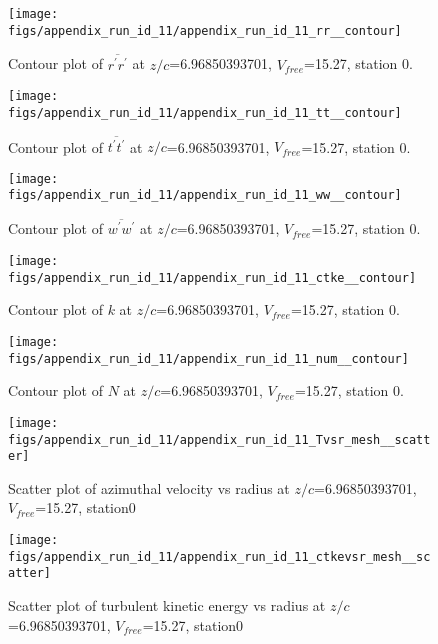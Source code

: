 \begin{figure}[H]
\centering
\texttt{[image: figs/appendix\_run\_id\_11/appendix\_run\_id\_11\_rr\_\_contour]}
\caption{Contour plot of $\overline{r^\prime r^\prime}$ at $z/c$=6.96850393701, $V_{free}$=15.27, station 0.}
\label{fig:appendix_run_id_11_rr__contour}
\end{figure}


\begin{figure}[H]
\centering
\texttt{[image: figs/appendix\_run\_id\_11/appendix\_run\_id\_11\_tt\_\_contour]}
\caption{Contour plot of $\overline{t^\prime t^\prime}$ at $z/c$=6.96850393701, $V_{free}$=15.27, station 0.}
\label{fig:appendix_run_id_11_tt__contour}
\end{figure}


\begin{figure}[H]
\centering
\texttt{[image: figs/appendix\_run\_id\_11/appendix\_run\_id\_11\_ww\_\_contour]}
\caption{Contour plot of $\overline{w^\prime w^\prime}$ at $z/c$=6.96850393701, $V_{free}$=15.27, station 0.}
\label{fig:appendix_run_id_11_ww__contour}
\end{figure}


\begin{figure}[H]
\centering
\texttt{[image: figs/appendix\_run\_id\_11/appendix\_run\_id\_11\_ctke\_\_contour]}
\caption{Contour plot of $k$ at $z/c$=6.96850393701, $V_{free}$=15.27, station 0.}
\label{fig:appendix_run_id_11_ctke__contour}
\end{figure}


\begin{figure}[H]
\centering
\texttt{[image: figs/appendix\_run\_id\_11/appendix\_run\_id\_11\_num\_\_contour]}
\caption{Contour plot of $N$ at $z/c$=6.96850393701, $V_{free}$=15.27, station 0.}
\label{fig:appendix_run_id_11_num__contour}
\end{figure}


\begin{figure}[H]
\centering
\texttt{[image: figs/appendix\_run\_id\_11/appendix\_run\_id\_11\_Tvsr\_mesh\_\_scatter]}
\caption{Scatter plot of azimuthal velocity vs radius at $z/c$=6.96850393701, $V_{free}$=15.27, station0}
\label{fig:appendix_run_id_11_Tvsr_mesh__scatter}
\end{figure}


\begin{figure}[H]
\centering
\texttt{[image: figs/appendix\_run\_id\_11/appendix\_run\_id\_11\_ctkevsr\_mesh\_\_scatter]}
\caption{Scatter plot of turbulent kinetic energy vs radius at $z/c$=6.96850393701, $V_{free}$=15.27, station0}
\label{fig:appendix_run_id_11_ctkevsr_mesh__scatter}
\end{figure}


